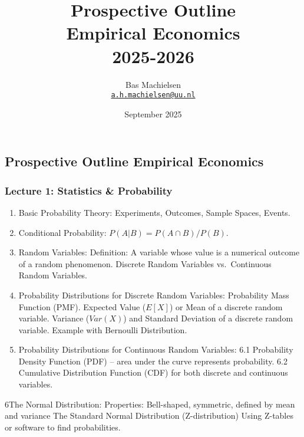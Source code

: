 \documentclass[
]{article}
\title{Prospective Outline\\
Empirical Economics\\
2025-2026}
\author{Bas Machielsen\\
\href{mailto:a.h.machielsen@uu.nl}{\nolinkurl{a.h.machielsen@uu.nl}}}
\date{September 2025}
\begin{document}
\maketitle

\subsection{Prospective Outline Empirical
Economics}\label{prospective-outline-empirical-economics}

\subsubsection{Lecture 1: Statistics \&
Probability}\label{lecture-1-statistics-probability}

\begin{enumerate}
\def\labelenumi{\arabic{enumi}.}
\item
  Basic Probability Theory: Experiments, Outcomes, Sample Spaces,
  Events.
\item
  Conditional Probability: \(P(A|B) = P(A \cap B) / P(B)\).
\item
  Random Variables: Definition: A variable whose value is a numerical
  outcome of a random phenomenon. Discrete Random Variables
  vs.~Continuous Random Variables.
\item
  Probability Distributions for Discrete Random Variables: Probability
  Mass Function (PMF). Expected Value (\(E[X]\)) or Mean of a discrete
  random variable. Variance (\(Var(X)\)) and Standard Deviation of a
  discrete random variable. Example with Bernoulli Distribution.
\item
  Probability Distributions for Continuous Random Variables: 6.1
  Probability Density Function (PDF) -- area under the curve represents
  probability. 6.2 Cumulative Distribution Function (CDF) for both
  discrete and continuous variables.
\end{enumerate}

6The Normal Distribution: Properties: Bell-shaped, symmetric, defined by
mean and variance The Standard Normal Distribution (Z-distribution)
Using Z-tables or software to find probabilities.
\end{document}
